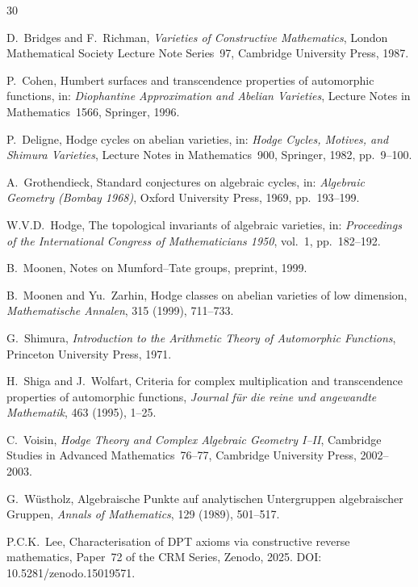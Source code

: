 \documentclass[11pt]{article}
\theoremstyle{plain}
\theoremstyle{definition}
\theoremstyle{remark}
\begin{document}
\begin{thebibliography}{30}

D.~Bridges and F.~Richman,
\textit{Varieties of Constructive Mathematics},
London Mathematical Society Lecture Note Series~97,
Cambridge University Press, 1987.

P.~Cohen,
Humbert surfaces and transcendence properties of automorphic functions,
in: \textit{Diophantine Approximation and Abelian Varieties},
Lecture Notes in Mathematics~1566, Springer, 1996.

P.~Deligne,
Hodge cycles on abelian varieties,
in: \textit{Hodge Cycles, Motives, and Shimura Varieties},
Lecture Notes in Mathematics~900, Springer, 1982, pp.~9--100.

A.~Grothendieck,
Standard conjectures on algebraic cycles,
in: \textit{Algebraic Geometry (Bombay 1968)}, Oxford University Press, 1969, pp.~193--199.

W.V.D.~Hodge,
The topological invariants of algebraic varieties,
in: \textit{Proceedings of the International Congress of Mathematicians 1950}, vol.~1, pp.~182--192.

B.~Moonen,
Notes on Mumford--Tate groups,
preprint, 1999.

B.~Moonen and Yu.~Zarhin,
Hodge classes on abelian varieties of low dimension,
\textit{Mathematische Annalen}, 315 (1999), 711--733.

G.~Shimura,
\textit{Introduction to the Arithmetic Theory of Automorphic Functions},
Princeton University Press, 1971.

H.~Shiga and J.~Wolfart,
Criteria for complex multiplication and transcendence properties of automorphic functions,
\textit{Journal f\"ur die reine und angewandte Mathematik}, 463 (1995), 1--25.

C.~Voisin,
\textit{Hodge Theory and Complex Algebraic Geometry I--II},
Cambridge Studies in Advanced Mathematics~76--77,
Cambridge University Press, 2002--2003.

G.~W\"ustholz,
Algebraische Punkte auf analytischen Untergruppen algebraischer Gruppen,
\textit{Annals of Mathematics}, 129 (1989), 501--517.

P.C.K.~Lee,
Characterisation of DPT axioms via constructive reverse mathematics,
Paper~72 of the CRM Series, Zenodo, 2025.
DOI: 10.5281/zenodo.15019571.


\end{thebibliography}
\end{document}

